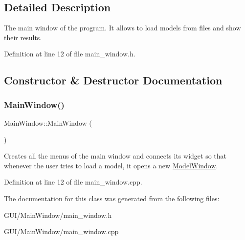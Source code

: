 \subsection{Detailed Description}
The main window of the program. It allows to load models from files and show their results. 

Definition at line 12 of file main\+\_\+window.\+h.



\subsection{Constructor \& Destructor Documentation}
\mbox{\label{classMainWindow_a34c4b4207b46d11a4100c9b19f0e81bb}} 
\subsubsection{\texorpdfstring{Main\+Window()}{MainWindow()}}
{\footnotesize\ttfamily Main\+Window\+::\+Main\+Window (\begin{DoxyParamCaption}{ }\end{DoxyParamCaption})}

Creates all the menus of the main window and connects its widget so that whenever the user tries to load a model, it opens a new \hyperlink{classModelWindow}{Model\+Window}. 

Definition at line 12 of file main\+\_\+window.\+cpp.



The documentation for this class was generated from the following files\+:\begin{DoxyCompactItemize}
\item 
G\+U\+I/\+Main\+Window/main\+\_\+window.\+h\item 
G\+U\+I/\+Main\+Window/main\+\_\+window.\+cpp\end{DoxyCompactItemize}

